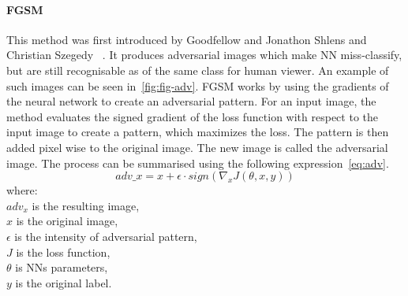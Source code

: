 \paragraph{FGSM}
This method was first introduced by Goodfellow and Jonathon Shlens and Christian Szegedy
~\cite{goodfellow2015explaining}.
It produces adversarial images which make NN miss-classify,
but are still recognisable as of the same class for human viewer.
An example of such images can be seen in~\ref{fig:fig-adv}.
FGSM works by using the gradients of the neural network to create an adversarial pattern.
For an input image,
the method evaluates the signed gradient of the loss function with respect to the input image to create a pattern,
which maximizes the loss.
The pattern is then added pixel wise to the original image.
The new image is called the adversarial image.
The process can be summarised using the following expression~\ref{eq:adv}.
\begin{equation}\label{eq:adv}
    adv\_x = x + \epsilon \cdot sign(\nabla_x J(\theta, x, y))
\end{equation}
where: \\
$adv_x$ is the resulting image, \\
$x$ is the original image, \\
$\epsilon$ is the intensity of adversarial pattern, \\
$J$ is the loss function, \\
$\theta$ is NNs parameters, \\
$y$ is the original label.
\\
